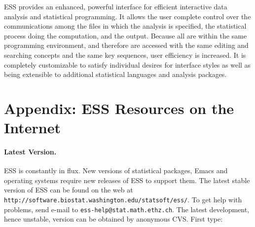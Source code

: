 \documentclass{article}
\def\url#1{\stexttt{#1}} %
\newcommand*{\SAS}{\textsc{SAS}}
\newcommand{\stexttt}[1]{{\small\texttt{#1}}}
\newenvironment{Comment}{\begin{quote}\small\itshape }{\end{quote}}
\begin{document}
ESS provides an enhanced, powerful interface for efficient interactive
data analysis and statistical programming.  It allows the user
complete control over the communications among the files in which the
analysis is specified, the statistical process doing the computation,
and the output.  Because all are within the same programming
environment, and therefore are accessed with the same editing and
searching concepts and the same key sequences, user efficiency is
increased.  It is completely customizable to satisfy individual
desires for interface styles as well as being extensible to additional
statistical languages and analysis packages.








\clearpage

\appendix 
\section{Appendix: ESS Resources on the Internet}
\label{sec:access}

\paragraph{Latest Version.}

ESS is constantly in flux.  New versions of statistical
packages, Emacs and operating systems require new releases of ESS to
support them.  The latest stable version of ESS can be found on the web at
\url{http://software.biostat.washington.edu/statsoft/ess/}.  To get help
with problems, send e-mail to \url{ess-help@stat.math.ethz.ch}.
The latest development, hence unstable, version can be obtained by
anonymous CVS.  First type:
\end{document}
